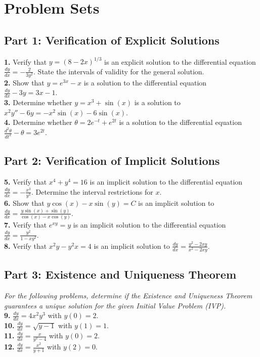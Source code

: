 \documentclass[12pt]{article}
\begin{document}
\newpage

\section{Problem Sets}

\subsection*{Part 1: Verification of Explicit Solutions}
\textbf{1.} Verify that $y = (8-2x)^{1/3}$ is an explicit solution to the differential equation $\frac{dy}{dx} = -\frac{2}{3y^2}$. State the intervals of validity for the general solution. \\
\textbf{2.} Show that $y = e^{3x} - x$ is a solution to the differential equation $\frac{dy}{dx} - 3y = 3x - 1$. \\
\textbf{3.} Determine whether $y = x^3 + \sin(x)$ is a solution to $x^2 y'' - 6y = -x^2 \sin(x) - 6\sin(x)$. \\
\textbf{4.} Determine whether $\theta = 2e^{-t} + e^{2t}$ is a solution to the differential equation $\frac{d^2\theta}{dt^2} - \theta = 3e^{2t}$.

\subsection*{Part 2: Verification of Implicit Solutions}
\textbf{5.} Verify that $x^4 + y^4 = 16$ is an implicit solution to the differential equation $\frac{dy}{dx} = -\frac{x^3}{y^3}$. Determine the interval restrictions for $x$. \\
\textbf{6.} Show that $y \cos(x) - x \sin(y) = C$ is an implicit solution to $\frac{dy}{dx} = \frac{y \sin(x) + \sin(y)}{\cos(x) - x \cos(y)}$. \\
\textbf{7.} Verify that $e^{xy} = y$ is an implicit solution to the differential equation $\frac{dy}{dx} = \frac{y^2}{1 - xy^2}$. \\
\textbf{8.} Verify that $x^2 y - y^2 x = 4$ is an implicit solution to $\frac{dy}{dx} = \frac{y^2 - 2xy}{x^2 - 2xy}$.

\subsection*{Part 3: Existence and Uniqueness Theorem}
\textit{For the following problems, determine if the Existence and Uniqueness Theorem guarantees a unique solution for the given Initial Value Problem (IVP).} \\
\textbf{9.} $\frac{dy}{dx} = 4x^2 y^3$ with $y(0) = 2$. \\
\textbf{10.} $\frac{dy}{dx} = \sqrt{y - 1}$ with $y(1) = 1$. \\
\textbf{11.} $\frac{dy}{dx} = \frac{x}{y^2 - 4}$ with $y(0) = 2$. \\
\textbf{12.} $\frac{dy}{dx} = \frac{x^2}{y + 1}$ with $y(2) = 0$.
\end{document}
